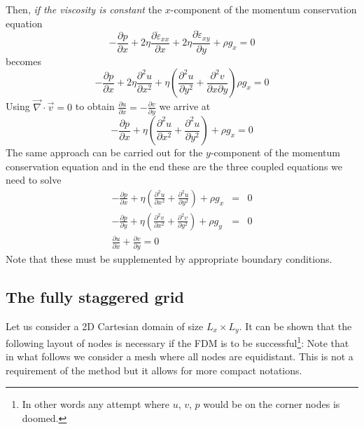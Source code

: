 Then, {\it if the viscosity is constant} the $x$-component of 
the momentum conservation equation
\[
-\frac{\partial p}{\partial x}  + 2\eta \frac{\partial \dot{\varepsilon}_{xx}}{\partial x} +  2\eta \frac{\partial \dot{\varepsilon}_{xy}}{\partial y}  + \rho g_x =0
\]
becomes
\[
-\frac{\partial p}{\partial x}  + 2\eta \frac{\partial^2 u}{\partial x^2} +  \eta 
\left( \frac{\partial^2 u}{\partial y^2 } + \frac{\partial^2 v}{\partial x \partial y} \right)  \rho g_x =0
\]
Using ${\vec \nabla} \cdot {\vec v} = 0$ to obtain $\frac{\partial u}{\partial x} =  - \frac{\partial v}{\partial y}  $ we arrive at 
\[
-\frac{\partial p}{\partial x}  + \eta \left( \frac{\partial^2 u}{\partial x^2} +  \frac{\partial^2 u}{\partial y^2 }  \right)
+ \rho g_x =0
\]
The same approach can be carried out for the $y$-component of the momentum conservation
equation and in the end
these are the three coupled equations we need to solve
\begin{eqnarray}
-\frac{\partial p}{\partial x}  
+ \eta \left( \frac{\partial^2 u}{\partial x^2} 
+ \frac{\partial^2 u}{\partial y^2 }  \right) + \rho g_x &=&0 \\
-\frac{\partial p}{\partial y}  
+ \eta \left( \frac{\partial^2 v}{\partial x^2} 
+ \frac{\partial^2 v}{\partial y^2 }  \right) + \rho g_y  &=& 0 \\
\frac{\partial u}{\partial x} + \frac{\partial v}{\partial y}  = 0 
\end{eqnarray}
Note that these must be supplemented by appropriate boundary conditions.

\subsection{The fully staggered grid}

Let us consider a 2D Cartesian domain of size $L_x \times L_y$.
It can be shown that the following layout of nodes is necessary 
if the FDM is to be successful\footnote{In other words
any attempt where $u$, $v$, $p$ would be on the corner nodes is doomed.}:
Note that in what follows we consider a mesh where all nodes are equidistant.
This is not a requirement of the method but it allows for more compact notations. 



